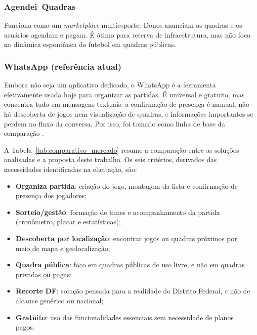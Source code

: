         \subsubsection*{Agendei~Quadras}
        Funciona como um \textit{marketplace} multiesporte. Donos anunciam as quadras e os usuários agendam e pagam. É ótimo para reserva de infraestrutura, mas não foca na dinâmica espontânea do futebol em quadras públicas.

        \subsubsection*{WhatsApp (referência atual)}
        Embora não seja um aplicativo dedicado, o WhatsApp é a ferramenta efetivamente usada hoje para organizar as partidas. É universal e gratuito, mas concentra tudo em mensagens textuais: a confirmação de presença é manual, não há descoberta de jogos nem visualização de quadras, e informações importantes se perdem no fluxo da conversa. Por isso, foi tomado como linha de base da comparação \cite{whatsapp_app}.

        A Tabela~\ref{tab:comparativo_mercado} resume a comparação entre as soluções analisadas e a proposta deste trabalho. Os seis critérios, derivados das necessidades identificadas na elicitação, são:

        \begin{itemize}
            \item \textbf{Organiza partida}: criação do jogo, montagem da lista e confirmação de presença dos jogadores;
            \item \textbf{Sorteio/gestão}: formação de times e acompanhamento da partida (cronômetro, placar e estatísticas);
            \item \textbf{Descoberta por localização}: encontrar jogos ou quadras próximos por meio de mapa e geolocalização;
            \item \textbf{Quadra pública}: foco em quadras públicas de uso livre, e não em quadras privadas ou pagas;
            \item \textbf{Recorte DF}: solução pensada para a realidade do Distrito Federal, e não de alcance genérico ou nacional;
            \item \textbf{Gratuito}: uso das funcionalidades essenciais sem necessidade de planos pagos.
        \end{itemize}

